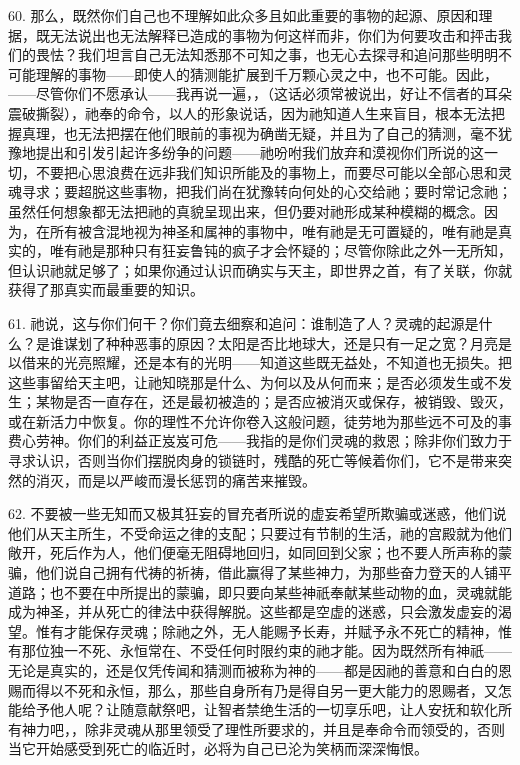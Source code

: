 60. 那么，既然你们自己也不理解如此众多且如此重要的事物的起源、原因和理据，既无法说出也无法解释已造成的事物为何这样而非，你们为何要攻击和抨击我们的畏怯？我们坦言自己无法知悉那不可知之事，也无心去探寻和追问那些明明不可能理解的事物——即使人的猜测能扩展到千万颗心灵之中，也不可能。因此，——尽管你们不愿承认——我再说一遍，，（这话必须常被说出，好让不信者的耳朵震破撕裂），祂奉的命令，以人的形象说话，因为祂知道人生来盲目，根本无法把握真理，也无法把摆在他们眼前的事视为确凿无疑，并且为了自己的猜测，毫不犹豫地提出和引发引起许多纷争的问题——祂吩咐我们放弃和漠视你们所说的这一切，不要把心思浪费在远非我们知识所能及的事物上，而要尽可能以全部心思和灵魂寻求；要超脱这些事物，把我们尚在犹豫转向何处的心交给祂；要时常记念祂；虽然任何想象都无法把祂的真貌呈现出来，但仍要对祂形成某种模糊的概念。因为，在所有被含混地视为神圣和属神的事物中，唯有祂是无可置疑的，唯有祂是真实的，唯有祂是那种只有狂妄鲁钝的疯子才会怀疑的；尽管你除此之外一无所知，但认识祂就足够了；如果你通过认识而确实与天主，即世界之首，有了关联，你就获得了那真实而最重要的知识。\par

61. 祂说，这与你们何干？你们竟去细察和追问：谁制造了人？灵魂的起源是什么？是谁谋划了种种恶事的原因？太阳是否比地球大，还是只有一足之宽？月亮是以借来的光亮照耀，还是本有的光明——知道这些既无益处，不知道也无损失。把这些事留给天主吧，让祂知晓那是什么、为何以及从何而来；是否必须发生或不发生；某物是否一直存在，还是最初被造的；是否应被消灭或保存，被销毁、毁灭，或在新活力中恢复。你的理性不允许你卷入这般问题，徒劳地为那些远不可及的事费心劳神。你们的利益正岌岌可危——我指的是你们灵魂的救恩；除非你们致力于寻求认识，否则当你们摆脱肉身的锁链时，残酷的死亡等候着你们，它不是带来突然的消灭，而是以严峻而漫长惩罚的痛苦来摧毁。\par

62. 不要被一些无知而又极其狂妄的冒充者所说的虚妄希望所欺骗或迷惑，他们说他们从天主所生，不受命运之律的支配；只要过有节制的生活，祂的宫殿就为他们敞开，死后作为人，他们便毫无阻碍地回归，如同回到父家；也不要人所声称的蒙骗，他们说自己拥有代祷的祈祷，借此赢得了某些神力，为那些奋力登天的人铺平道路；也不要在中所提出的蒙骗，即只要向某些神祇奉献某些动物的血，灵魂就能成为神圣，并从死亡的律法中获得解脱。这些都是空虚的迷惑，只会激发虚妄的渴望。惟有才能保存灵魂；除祂之外，无人能赐予长寿，并赋予永不死亡的精神，惟有那位独一不死、永恒常在、不受任何时限约束的祂才能。因为既然所有神祇——无论是真实的，还是仅凭传闻和猜测而被称为神的——都是因祂的善意和白白的恩赐而得以不死和永恒，那么，那些自身所有乃是得自另一更大能力的恩赐者，又怎能给予他人呢？让随意献祭吧，让智者禁绝生活的一切享乐吧，让人安抚和软化所有神力吧，，除非灵魂从那里领受了理性所要求的，并且是奉命令而领受的，否则当它开始感受到死亡的临近时，必将为自己已沦为笑柄而深深悔恨。\par


